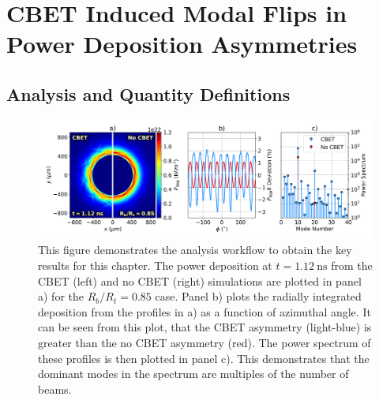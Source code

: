 \section{CBET Induced Modal Flips in Power Deposition Asymmetries}%
\label{sec:Res1_PdepR_CBET_asymm}


\subsection{Analysis and Quantity Definitions}%
\label{sec:Res1_analysis_and_def}

\begin{figure}[t!]
    \includegraphics[width=\linewidth]{Results1/Images/Mode_analysis.png}
    \centering
    \caption{This figure demonstrates the analysis workflow to obtain the key results for this chapter.
    The power deposition at $t=1.12\ \text{ns}$ from the \ac{CBET} (left) and no \ac{CBET} (right) simulations are plotted in panel a) for the $R_b/R_t=0.85$ case.
    Panel b) plots the radially integrated deposition from the profiles in a) as a function of azimuthal angle.
    It can be seen from this plot, that the \ac{CBET} asymmetry (light-blue) is greater than the no \ac{CBET} asymmetry (red).
    The power spectrum of these profiles is then plotted in panel c).
    This demonstrates that the dominant modes in the spectrum are multiples of the number of beams.}%
    \label{fig:Res1_analysis}
\end{figure}


